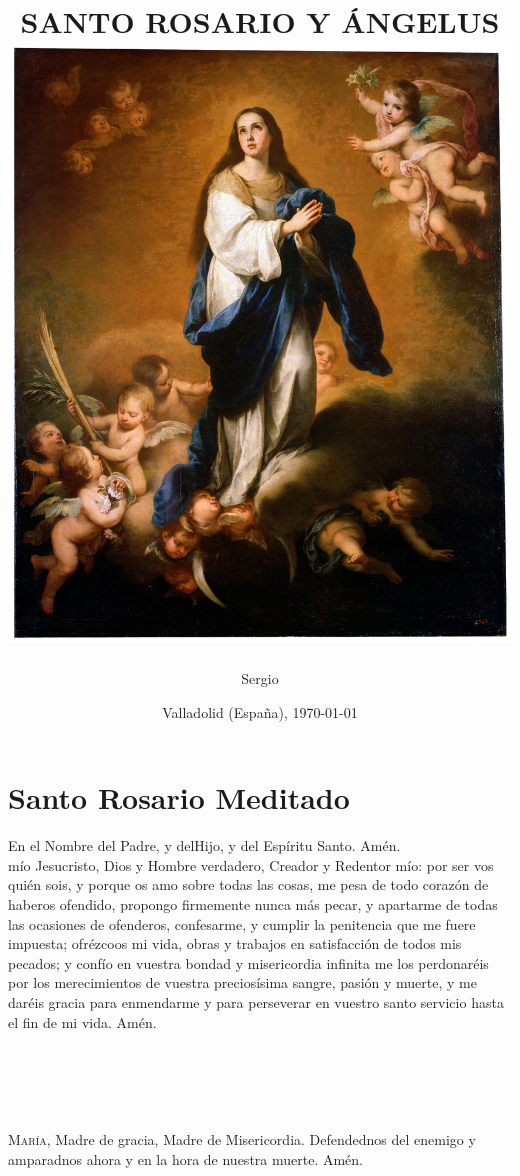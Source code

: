 \documentclass[10pt,a4paper,oneside]{book}
\title{
    {\Huge \uppercase{Santo Rosario y Ángelus}}\\
    {\includegraphics{foto-04.jpg}}\\
}
\author{Sergio}
\date{Valladolid (España), \monthyeardate\today}
\newcommand\blankpage{%
    \null
    \thispagestyle{empty}%
    \addtocounter{page}{-1}%
    \newpage
}
\begin{document}
\maketitle
\afterpage{\blankpage}

\chapter*{Santo Rosario Meditado}

\begin{minipage}[t]{0.475\textwidth}
      En el Nombre del Padre, y del{\redcross}Hijo, y del Espíritu Santo. Amén.\\

       mío Jesucristo, Dios y Hombre verdadero, Creador y Redentor mío: por ser vos quién sois, y porque os amo sobre todas las cosas,
      me pesa de todo corazón de haberos ofendido, propongo firmemente nunca más pecar, y apartarme de todas las ocasiones de ofenderos,
      confesarme, y cumplir la penitencia que me fuere impuesta; ofrézcoos mi vida, obras y trabajos en satisfacción de todos mis pecados;
      y confío en vuestra bondad y misericordia infinita me los perdonaréis por los merecimientos de vuestra preciosísima sangre, pasión y muerte,
      y me daréis gracia para enmendarme y para perseverar en vuestro santo servicio hasta el fin de mi vida. Amén.\\

      \\
      \\\\
      \\\\
      \textsc{María}, Madre de gracia, Madre de Misericordia. Defendednos del enemigo y amparadnos ahora y en la hora de nuestra muerte. Amén. 
\end{minipage}
\end{document}
